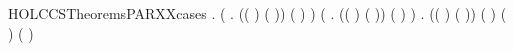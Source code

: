 \newcommand{\HOLCCSTheoremsPARThree}{\UseVerbatim{HOLCCSTheoremsPARThree}}
\begin{SaveVerbatim}{HOLCCSTheoremsPARXXcases}
\HOLTokenTurnstile{} \HOLSymConst{\HOLTokenForall{}}   .
        \HOLSymConst{\ensuremath{\parallel}}  \HOLTokenTransBegin{}\HOLTokenTransEnd {} \HOLSymConst{\HOLTokenImp{}}
       (\HOLSymConst{\HOLTokenExists{}}  .
            (( \HOLSymConst{=} ) \HOLSymConst{\HOLTokenConj{}} ( \HOLSymConst{=} )) \HOLSymConst{\HOLTokenConj{}} ( \HOLSymConst{=}  \HOLSymConst{\ensuremath{\parallel}} ) \HOLSymConst{\HOLTokenConj{}}  \HOLTokenTransBegin{}\HOLTokenTransEnd {}) \HOLSymConst{\HOLTokenDisj{}}
       (\HOLSymConst{\HOLTokenExists{}}  .
            (( \HOLSymConst{=} ) \HOLSymConst{\HOLTokenConj{}} ( \HOLSymConst{=} )) \HOLSymConst{\HOLTokenConj{}} ( \HOLSymConst{=}  \HOLSymConst{\ensuremath{\parallel}} ) \HOLSymConst{\HOLTokenConj{}}  \HOLTokenTransBegin{}\HOLTokenTransEnd {}) \HOLSymConst{\HOLTokenDisj{}}
       \HOLSymConst{\HOLTokenExists{}}    .
           (( \HOLSymConst{=} ) \HOLSymConst{\HOLTokenConj{}} ( \HOLSymConst{=} )) \HOLSymConst{\HOLTokenConj{}} ( \HOLSymConst{=} \HOLConst{\ensuremath{\tau}}) \HOLSymConst{\HOLTokenConj{}} ( \HOLSymConst{=}  \HOLSymConst{\ensuremath{\parallel}} ) \HOLSymConst{\HOLTokenConj{}}
            \HOLTokenTransBegin{} \HOLTokenTransEnd {} \HOLSymConst{\HOLTokenConj{}}  \HOLTokenTransBegin{} ( )\HOLTokenTransEnd {}
\end{SaveVerbatim}

